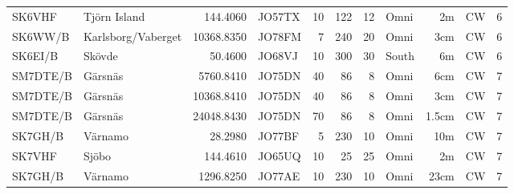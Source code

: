 \begin{longtable}{llrlrrrlrll}
	SK6VHF   & Tjörn Island        &   144.4060 & JO57TX &   10 &  122 &   12 & Omni    &    2m & CW     & 6    \\
	SK6WW/B  & Karlsborg/Vaberget  & 10368.8350 & JO78FM &    7 &  240 &   20 & Omni    &   3cm & CW     & 6    \\
	SK6EI/B  & Skövde              &    50.4600 & JO68VJ &   10 &  300 &   30 & South   &    6m & CW     & 6    \\
	SM7DTE/B & Gärsnäs             &  5760.8410 & JO75DN &   40 &   86 &    8 & Omni    &   6cm & CW     & 7    \\
	SM7DTE/B & Gärsnäs             & 10368.8410 & JO75DN &   40 &   86 &    8 & Omni    &   3cm & CW     & 7    \\
	SM7DTE/B & Gärsnäs             & 24048.8430 & JO75DN &   70 &   86 &    8 & Omni    & 1.5cm & CW     & 7    \\
	SK7GH/B  & Värnamo             &    28.2980 & JO77BF &    5 &  230 &   10 & Omni    &   10m & CW     & 7    \\
	SK7VHF   & Sjöbo               &   144.4610 & JO65UQ &   10 &   25 &   25 & Omni    &    2m & CW     & 7    \\
	SK7GH/B  & Värnamo             &  1296.8250 & JO77AE &   10 &  230 &   10 & Omni    &  23cm & CW     & 7
\end{longtable}

